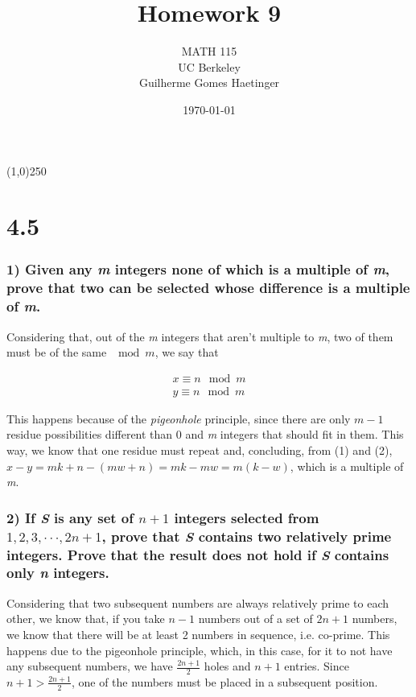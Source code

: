 \documentclass[11pt]{article}
\author{MATH 115 \\ UC Berkeley \\ Guilherme Gomes Haetinger}
\date{\today}
\title{Homework 9}
\begin{document}
\maketitle
\begin{center}
\line(1,0){250}
\end{center}


\section*{4.5}
\label{sec:orga5835b8}
\subsubsection*{1) Given any \emph{m} integers none of which is a multiple of \emph{m}, prove that two can be selected whose difference is a multiple of \emph{m}.}
\label{sec:org3331f5d}

Considering that, out of the \emph{m} integers that aren't multiple to \emph{m}, two of them must be of the same \(\mod m\), we say that 

\begin{eqnarray}
 x \equiv n \mod m \\
 y \equiv n \mod m 
\end{eqnarray}

This happens because of the \emph{pigeonhole} principle, since there are only \(m-1\) residue possibilities different than 0 and \emph{m} integers that should fit in them. This way, we know that one residue must repeat and, concluding, from (1) and (2), \(x - y = mk + n - (mw + n) = mk - mw = m(k - w)\), which is a multiple of \emph{m}.

\subsubsection*{2) If \emph{S} is any set of \(n + 1\) integers selected from \(1, 2, 3, · · ·, 2n + 1\), prove that \emph{S} contains two relatively prime integers. Prove that the result does not hold if \emph{S} contains only \emph{n} integers.}
\label{sec:orgbc7a6af}

Considering that two subsequent numbers are always relatively prime to each other, we know that, if you take \(n-1\) numbers out of a set of \(2n + 1\) numbers, we know that there will be at least 2 numbers in sequence, i.e. co-prime. This happens due to the pigeonhole principle, which, in this case, for it to not have any subsequent numbers, we have \(\frac{2n+1}{2}\) holes and \(n+1\) entries. Since \(n+1 > \frac{2n+1}{2}\), one of the numbers must be placed in a subsequent position.
\end{document}
